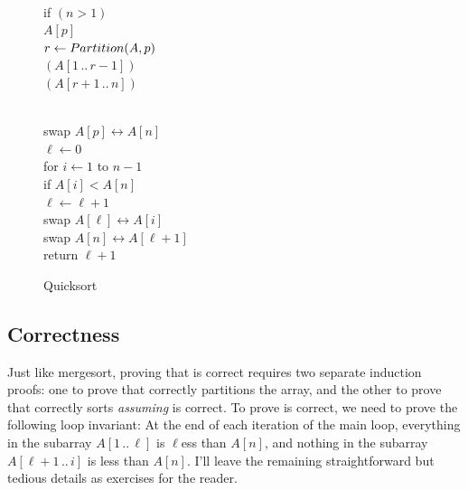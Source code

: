\begin{figure}[ht]
\centering
\begin{minipage}[c]{0.54\linewidth}
\begin{pseudocode}
\\
if $(n > 1)$\\
 $A[p]$\\
\Indent $r \gets Partition(A, p)$\\
\Indent {}$(A[1\,..\,r-1])$ \\
\Indent {}$(A[r+1\,..\,n])$ 
\end{pseudocode}
\end{minipage}\hfill
\begin{minipage}[c]{0.45\linewidth}
\begin{pseudocode}
\\
swap $A[p] \leftrightarrow A[n]$\\
$\ell \gets 0$ \\
for $i \gets 1$ to $n-1$\\
\Indent if $A[i] < A[n]$\\
\Indent\Indent $\ell \gets \ell + 1$\\
\Indent\Indent swap $A[\ell] \leftrightarrow A[i]$\\
swap $A[n] \leftrightarrow A[\ell + 1]$\\
return $\ell + 1$
\end{pseudocode}
\end{minipage}
\caption{Quicksort}
\label{fig:1.8}
\end{figure}
\subsection{Correctness}
Just like mergesort, proving that  is correct requires two separate induction proofs: one to prove that  correctly partitions the array, and the other to prove that  correctly sorts \emph{assuming}  is correct. To prove  is correct, we need to prove the following loop invariant: At the end of each iteration of the main loop, everything in the subarray $A[1\,..\,\ell]$ is $\ell$ess than $A[n]$, and nothing in the subarray $A[\ell + 1\,..\,i]$ is less than $A[n]$. I’ll leave the remaining straightforward but tedious details as exercises for the reader.

